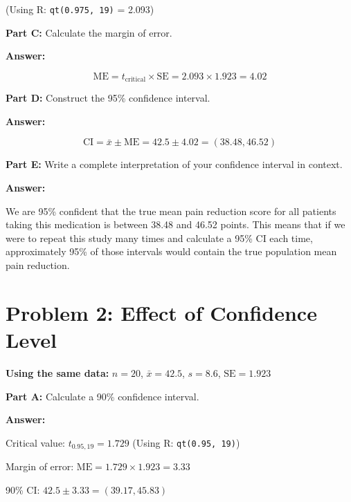 \documentclass[11pt]{article}
\begin{document}
(Using R: \texttt{qt(0.975, 19)} = 2.093)

\vspace{6pt}

\textbf{Part C:} Calculate the margin of error.

\textcolor{answergreen}{\textbf{Answer:}}

$$\text{ME} = t_{\text{critical}} \times \text{SE} = 2.093 \times 1.923 = 4.02$$

\vspace{6pt}

\textbf{Part D:} Construct the 95\% confidence interval.

\textcolor{answergreen}{\textbf{Answer:}}

$$\text{CI} = \bar{x} \pm \text{ME} = 42.5 \pm 4.02 = (38.48, 46.52)$$

\vspace{6pt}

\textbf{Part E:} Write a complete interpretation of your confidence interval in context.

\textcolor{answergreen}{\textbf{Answer:}}

We are 95\% confident that the true mean pain reduction score for all patients taking this medication is between 38.48 and 46.52 points. This means that if we were to repeat this study many times and calculate a 95\% CI each time, approximately 95\% of those intervals would contain the true population mean pain reduction.

\newpage

\section{Problem 2: Effect of Confidence Level}

\textbf{Using the same data:} $n=20$, $\bar{x}=42.5$, $s=8.6$, $\text{SE}=1.923$

\vspace{6pt}

\textbf{Part A:} Calculate a 90\% confidence interval.

\textcolor{answergreen}{\textbf{Answer:}}

Critical value: $t_{0.95, 19} = 1.729$ (Using R: \texttt{qt(0.95, 19)})

Margin of error: $\text{ME} = 1.729 \times 1.923 = 3.33$

90\% CI: $42.5 \pm 3.33 = (39.17, 45.83)$

\vspace{6pt}
\end{document}
